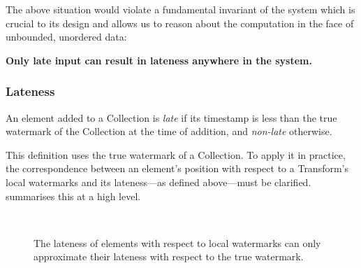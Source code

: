 The above situation would violate a fundamental invariant of the system which is crucial to its design and allows us to reason about the computation in the face of unbounded, unordered data:

\textbf{Only late input can result in lateness anywhere in the system.}

\subsubsection{Lateness}

An element added to a Collection is \emph{late} if its timestamp is less than the true watermark of the Collection at the time of addition, and \emph{non-late} otherwise.

This definition uses the true watermark of a Collection.
To apply it in practice, the correspondence between an element's position with respect to a Transform's local watermarks and its lateness---as defined above---must be clarified.
 summarises this at a high level.

\begin{figure}[t]
	\\
	\caption{The lateness of elements with respect to local watermarks can only approximate their lateness with respect to the true watermark.}
	\label{fig:impl:lateness-knowability}
\end{figure}

